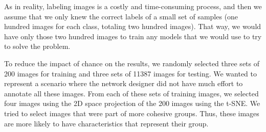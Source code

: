 \documentclass[a4paper,conference]{IEEEtran}
\begin{document}
As in reality, labeling images is a costly and time-consuming process, and then we assume that we only knew the correct labels of a small set of samples (one hundred images for each class, totaling two hundred images). That way, we would have only those two hundred images to train any models that we would use to try to solve the problem.

To reduce the impact of chance on the results, we randomly selected three sets of 200 images for training and three sets of 11387 images for testing. We wanted to represent a scenario where the network designer did not have much effort to annotate all these images. From each of these sets of training images, we selected four images using the 2D space projection of the 200 images using the t-SNE. We tried to select images that were part of more cohesive groups. Thus, these images are more likely to have characteristics that represent their group.
\end{document}
